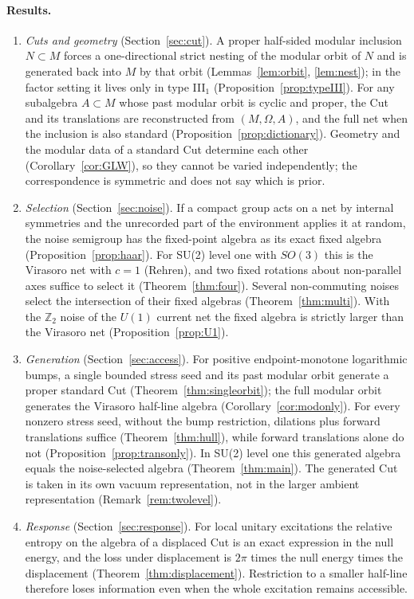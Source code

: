 \documentclass[12pt]{article}
\theoremstyle{definition}
\theoremstyle{remark}
\begin{document}
\paragraph{Results.}
\begin{enumerate}[label=(\roman*),leftmargin=2em,itemsep=2pt]
\item \emph{Cuts and geometry} (Section~\ref{sec:cut}). A proper half-sided modular
inclusion \(N\subset M\) forces a one-directional strict nesting of the modular
orbit of \(N\) and is generated back into \(M\) by that orbit
(Lemmas~\ref{lem:orbit}, \ref{lem:nest}); in the factor setting it lives only in type III\(_1\)
(Proposition~\ref{prop:typeIII}). For any subalgebra \(A\subset M\) whose past
modular orbit is cyclic and proper, the Cut and its translations are reconstructed from
\((M,\Omega,A)\), and the full net when the inclusion is also standard
(Proposition~\ref{prop:dictionary}). Geometry
and the modular data of a standard Cut determine each other
(Corollary~\ref{cor:GLW}), so they cannot be varied independently; the
correspondence is symmetric and does not say which is prior.
\item \emph{Selection} (Section~\ref{sec:noise}). If a compact group acts on a net by
internal symmetries and the unrecorded part of the environment applies it at
random, the noise semigroup has the fixed-point algebra as its exact fixed algebra
(Proposition~\ref{prop:haar}). For SU(2) level one with \(SO(3)\) this is the
Virasoro net with \(c=1\) (Rehren), and two fixed rotations about non-parallel axes suffice to select it
(Theorem~\ref{thm:four}). Several non-commuting noises select the intersection of
their fixed algebras (Theorem~\ref{thm:multi}). With the \(\mathbb Z_2\)
noise of the \(U(1)\) current net the fixed algebra is strictly larger than the
Virasoro net (Proposition~\ref{prop:U1}).
\item \emph{Generation} (Section~\ref{sec:access}). For positive endpoint-monotone
logarithmic bumps, a single bounded stress seed and its past modular orbit
generate a proper standard Cut (Theorem~\ref{thm:singleorbit}); the full modular
orbit generates the Virasoro half-line algebra (Corollary~\ref{cor:modonly}).
For every nonzero stress seed, without the bump restriction, dilations plus
forward translations suffice (Theorem~\ref{thm:hull}), while forward translations
alone do not (Proposition~\ref{prop:transonly}). In SU(2) level one this generated
algebra equals the noise-selected algebra (Theorem~\ref{thm:main}). The generated
Cut is taken in its own vacuum representation, not in the larger ambient
representation (Remark~\ref{rem:twolevel}).
\item \emph{Response} (Section~\ref{sec:response}). For local unitary excitations the
relative entropy on the algebra of a displaced Cut is an exact expression in the
null energy, and the loss under displacement is \(2\pi\) times the null energy
times the displacement (Theorem~\ref{thm:displacement}). Restriction to a smaller
half-line therefore loses information even when the whole excitation remains
accessible.
\end{enumerate}
\end{document}
